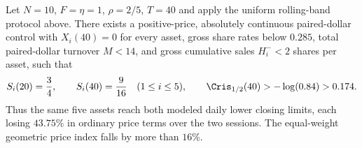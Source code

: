 \documentclass[review,hidelinks,onefignum,onetabnum]{siamonline250211}
\begin{document}
\begin{proposition}\label{prop:five-two-day-limits}
Let $N=10$, $F=\eta=1$, $\rho=2/5$, $T=40$ and apply the uniform rolling-band protocol above. There exists a positive-price, absolutely continuous paired-dollar control with $X_i(40)=0$ for every asset, gross share rates below $0.285$, total paired-dollar turnover $M<14$, and gross cumulative sales $H_i^-<2$ shares per asset, such that
\begin{equation}\label{eq:target-twoday}
 S_i(20)=\frac34,\qquad S_i(40)=\frac9{16}
 \quad(1\le i\le5),\qquad
 \Cris_{1/2}(40)>-\log(0.84)>0.174.
\end{equation}
Thus the same five assets reach both modeled daily lower closing limits, each losing $43.75\%$ in ordinary price terms over the two sessions. The equal-weight geometric price index falls by more than $16\%$.
\end{proposition}
\end{document}
